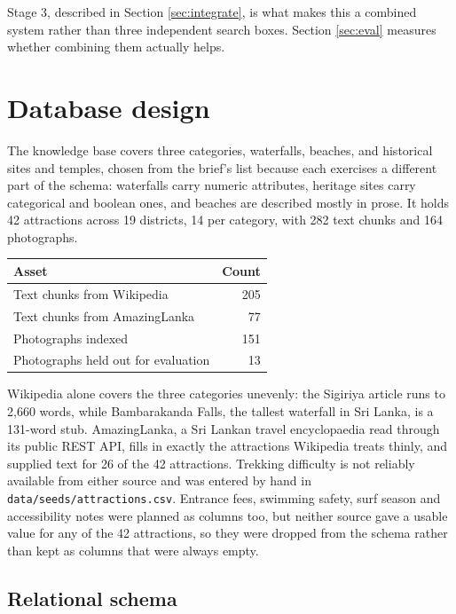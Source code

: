 \documentclass[11pt,a4paper]{article}
\newcommand{\code}[1]{\texttt{\small #1}}
\begin{document}
Stage 3, described in Section \ref{sec:integrate}, is what makes this a
combined system rather than three independent search boxes. Section
\ref{sec:eval} measures whether combining them actually helps.

\section{Database design}

The knowledge base covers three categories, waterfalls, beaches, and
historical sites and temples, chosen from the brief's list because each
exercises a different part of the schema: waterfalls carry numeric attributes,
heritage sites carry categorical and boolean ones, and beaches are described
mostly in prose. It holds 42 attractions across 19 districts, 14 per category,
with 282 text chunks and 164 photographs.

\begin{center}
\begin{tabular}{@{}lr@{}}
\toprule
\textbf{Asset} & \textbf{Count} \\
\midrule
Text chunks from Wikipedia          & 205 \\
Text chunks from AmazingLanka       & 77 \\
Photographs indexed                 & 151 \\
Photographs held out for evaluation & 13 \\
\bottomrule
\end{tabular}
\end{center}

Wikipedia alone covers the three categories unevenly: the Sigiriya article runs
to 2{,}660 words, while Bambarakanda Falls, the tallest waterfall in Sri Lanka,
is a 131-word stub. AmazingLanka, a Sri Lankan travel encyclopaedia read
through its public REST API, fills in exactly the attractions Wikipedia treats
thinly, and supplied text for 26 of the 42 attractions. Trekking difficulty is
not reliably available from either source and was entered by hand in
\code{data/seeds/attractions.csv}. Entrance fees, swimming safety, surf season
and accessibility notes were planned as columns too, but neither source gave
a usable value for any of the 42 attractions, so they were dropped from the
schema rather than kept as columns that were always empty.

\subsection{Relational schema}
\end{document}
